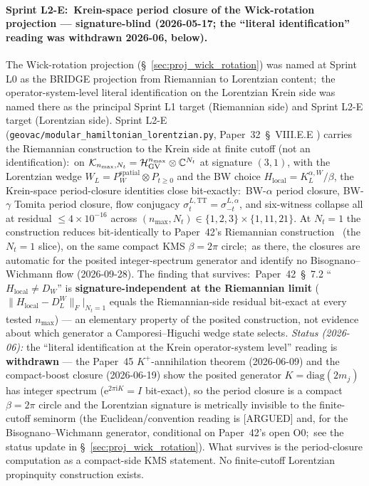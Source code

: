 \documentclass[11pt]{article}
\begin{document}
\paragraph{Sprint L2-E:\ Krein-space period closure of the
Wick-rotation projection --- signature-blind (2026-05-17; the
``literal identification'' reading was withdrawn 2026-06, below).}
The Wick-rotation projection (\S~\ref{sec:proj_wick_rotation}) was
named at Sprint L0 as the BRIDGE projection from Riemannian to
Lorentzian content;\ the operator-system-level literal identification
on the Lorentzian Krein side was named there as the principal Sprint L1
target (Riemannian side) and Sprint L2-E target (Lorentzian side).
Sprint L2-E (\verb|geovac/modular_hamiltonian_lorentzian.py|,
Paper~32~\S~VIII.E.E
\cite{paper32}) carries the Riemannian construction to the Krein side
at finite cutoff (not an identification):\ on $\mathcal{K}_{n_{\max}, N_t} = \mathcal{H}_{\rm GV}^{n_{\max}}
\otimes \mathbb{C}^{N_t}$ at signature $(3, 1)$, with the Lorentzian
wedge $W_L = P_W^{\mathrm{spatial}} \otimes P_{t \geq 0}$ and the
BW choice $H_{\mathrm{local}} = K_L^{\alpha, W}/\beta$, the Krein-space
period-closure identities close bit-exactly:\ BW-$\alpha$
period closure, BW-$\gamma$ Tomita period closure, flow conjugacy
$\sigma_t^{L, \mathrm{TT}} = \sigma_{-t}^{L, \alpha}$, and six-witness
collapse all at residual $\leq 4 \times 10^{-16}$ across
$(n_{\max}, N_t) \in \{1, 2, 3\} \times \{1, 11, 21\}$.  At $N_t = 1$
the construction reduces bit-identically to Paper~42's Riemannian
construction~\cite{paper42} (the $N_t = 1$ slice), on the same compact KMS
$\beta = 2\pi$ circle;\ as there, the closures are automatic for the
posited integer-spectrum generator and identify no Bisognano--Wichmann
flow (2026-09-28).  The finding that survives:\ Paper~42~\S~7.2
``$H_{\mathrm{local}} \neq D_W$'' is \textbf{signature-independent at the
Riemannian limit} ($\|H_{\mathrm{local}} - D_L^W\|_F|_{N_t=1}$ equals
the Riemannian-side residual bit-exact at every tested $n_{\max}$) ---
an elementary property of the posited construction, not evidence about
which generator a Camporesi--Higuchi wedge state selects.  \emph{Status (2026-06):} the
``literal identification at the Krein operator-system level'' reading is
\textbf{withdrawn} --- the Paper~45 $K^+$-annihilation theorem
(2026-06-09) and the compact-boost closure (2026-06-19) show the
posited generator $K = \mathrm{diag}(2m_j)$ has integer spectrum
($\mathrm{e}^{2\pi\mathrm{i}K} = I$ bit-exact), so the period closure is
a compact $\beta = 2\pi$ circle and the Lorentzian signature is
metrically invisible to the finite-cutoff seminorm (the Euclidean/convention
reading is [ARGUED] and, for the Bisognano--Wichmann generator,
conditional on Paper~42's open O0;\ see the status update in
\S~\ref{sec:proj_wick_rotation}).  What survives is the
period-closure computation as a compact-side KMS statement.  No
finite-cutoff Lorentzian propinquity construction exists.
\end{document}
